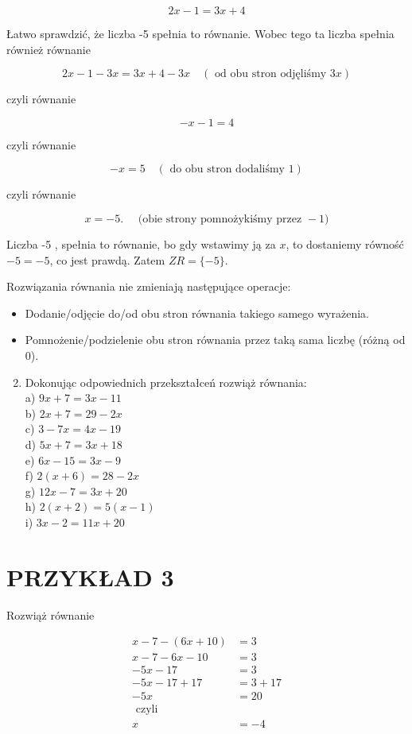 \documentclass[10pt]{article}
\begin{document}
\[
2 x-1=3 x+4
\]

Łatwo sprawdzić, że liczba -5 spełnia to równanie. Wobec tego ta liczba spełnia również równanie

\[
2 x-1-3 x=3 x+4-3 x \quad(\text { od obu stron odjęliśmy } 3 x)
\]

czyli równanie

\[
-x-1=4
\]

czyli równanie

\[
-x=5 \quad(\text { do obu stron dodaliśmy } 1)
\]

czyli równanie

\[
x=-5 . \quad \text { (obie strony pomnożykiśmy przez }-1)
\]

Liczba -5 , spełnia to równanie, bo gdy wstawimy ją za \(x\), to dostaniemy równość \(-5=-5\), co jest prawdą. Zatem \(Z R=\{-5\}\).

Rozwiązania równania nie zmieniają następujące operacje:

\begin{itemize}
  \item Dodanie/odjęcie do/od obu stron równania takiego samego wyrażenia.
  \item Pomnożenie/podzielenie obu stron równania przez taką sama liczbę (różną od 0).
\end{itemize}

\begin{enumerate}
  \setcounter{enumi}{1}
  \item Dokonując odpowiednich przekształceń rozwiąż równania:\\
a) \(9 x+7=3 x-11\)\\
b) \(2 x+7=29-2 x\)\\
c) \(3-7 x=4 x-19\)\\
d) \(5 x+7=3 x+18\)\\
e) \(6 x-15=3 x-9\)\\
f) \(2(x+6)=28-2 x\)\\
g) \(12 x-7=3 x+20\)\\
h) \(2(x+2)=5(x-1)\)\\
i) \(3 x-2=11 x+20\)
\end{enumerate}

\section*{PRZYKŁAD 3}
Rozwiąż równanie

\[
\begin{aligned}
x-7-(6 x+10) & =3 \\
x-7-6 x-10 & =3 \\
-5 x-17 & =3 \\
-5 x-17+17 & =3+17 \\
-5 x & =20 \\
\text { czyli } & \\
x & =-4
\end{aligned}
\]
\end{document}
